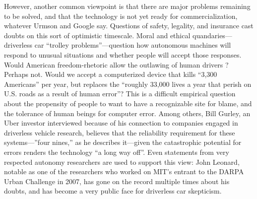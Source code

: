 
However, another common viewpoint is that there are major problems remaining to be
solved, and that the technology is not yet ready for
commercialization, whatever Urmson and Google 
say. Questions of safety, legality, and insurance cast doubts on this
sort of optimistic timescale. Moral and ethical
quandaries---driverless car ``trolley problems''---question how
autonomous machines will respond to unusual situations and whether
people will accept those responses. Would American freedom-rhetoric
allow the outlawing of human drivers \cite{???-http://www.washingtonpost.com/blogs/wonkblog/wp/2015/03/18/should-we-outlaw-human-drivers-in-a-world-of-driverless-cars/}? 
Perhaps not. Would we accept a computerized device that kills ``3,300
Americans'' per year, but replaces the ``roughly 33,000 lives a year
that perish on U.S. roads as a result of human
error''\cite{???-http://www.washingtonpost.com/blogs/innovations/wp/2015/03/16/driverless-cars-a-tremendous-innovation-with-a-glaring-achilles-heel/}?
This is a difficult empirical question about the propensity of people
to want to have a recognizable site for blame, and the tolerance of
human beings for computer error. Among others, Bill Gurley, an Uber
investor interviewed because of his connection to companies engaged in
driverless vehicle research, believes that the reliability requirement
for these systems---''four nines,'' as he describes it---given the
catastrophic potential for errors renders the technology ``a long way
off''\cite{???--http://www.businessinsider.com/bill-gurley-is-skeptical-of-driverless-cars-2015-3}.
Even statements from very respected autonomy researchers are used to
support this view: John Leonard, notable as one of the researchers who
worked on MIT's entrant to the DARPA Urban Challenge in 2007, has gone
on the record multiple times about his doubts, and has become a very
public face for driverless car skepticism\cite{???-gomes}.

